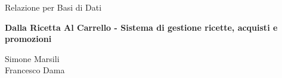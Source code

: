 \documentclass[12pt,a4paper]{report}
\begin{document}
\begin{titlepage}
    \centering
    {\Large Relazione per Basi di Dati\par}

    \vspace{1cm}

    {\Huge\bfseries Dalla Ricetta Al Carrello - Sistema di gestione ricette, acquisti e promozioni\par}

    \vfill

    \begin{flushright}
        Simone Marsili\\
        Francesco Dama
    \end{flushright}
\end{titlepage}

\clearpage
{}
\tableofcontents

\clearpage
{}






%
%
\end{document}
